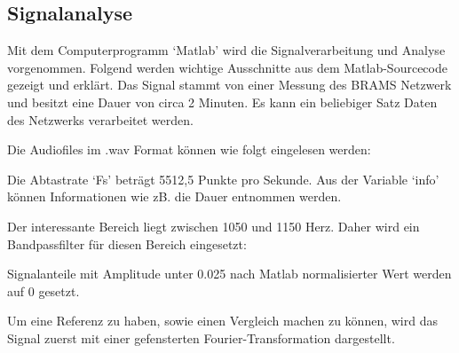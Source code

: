 \begin{refsection}
\subsection{Signalanalyse}
Mit dem Computerprogramm `Matlab' wird die Signalverarbeitung und Analyse vorgenommen.
Folgend werden wichtige Ausschnitte aus dem Matlab-Sourcecode gezeigt und erklärt.
Das Signal stammt von einer Messung des BRAMS Netzwerk und besitzt eine Dauer von circa 2 Minuten.
Es kann ein beliebiger Satz Daten des Netzwerks verarbeitet werden.

Die Audiofiles im .wav Format können wie folgt eingelesen werden:

Die Abtastrate `Fs' beträgt 5512,5 Punkte pro Sekunde.
Aus der Variable `info' können Informationen wie zB. die Dauer entnommen werden. 

Der interessante Bereich liegt zwischen 1050 und 1150 Herz.
Daher wird ein Bandpassfilter für diesen Bereich eingesetzt:


Signalanteile mit Amplitude unter 0.025 nach Matlab normalisierter Wert werden auf 0 gesetzt.


Um eine Referenz zu haben, sowie einen Vergleich machen zu können, wird das Signal zuerst mit einer gefensterten Fourier-Transformation dargestellt. 



\end{refsection}
